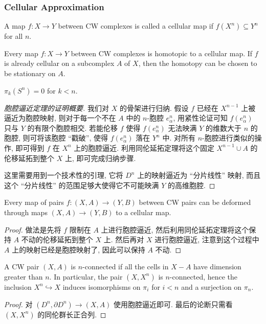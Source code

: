 \subsubsection{Cellular Approximation}
\begin{definition}
    A map $f:X\to Y$ between CW complexes is called a cellular map if $f(X^n)\subseteq Y^n$ for all $n$.
\end{definition}
\begin{theorem}
    Every map $f:X\to Y$ between CW complexes is homotopic to a cellular map. 
    If $f$ is already cellular on a subcomplex $A$ of $X$, then the homotopy can be chosen to be stationary on $A$.
\end{theorem}
\begin{corollary}
    $\pi_k(S^n)=0$ for $k<n$. 
\end{corollary}
\begin{proof}[胞腔逼近定理的证明概要]
    我们对 $X$ 的骨架进行归纳. 假设 $f$ 已经在 $X^{n-1}$ 上被逼近为胞腔映射, 则对于每一个不在 $A$ 中的 $n$-胞腔 $e_\alpha^n$, 
    用紧性论证可知 $f(e_\alpha^n)$ 只与 $Y$ 的有限个胞腔相交. 若能伦移 $f$ 使得 $f(e_\alpha^n)$ 无法映满 $Y$ 的维数大于 $n$ 的胞腔, 
    则可将该胞腔 “戳破”, 使得 $f(e_\alpha^n)$ 落在 $Y^n$ 中. 对所有 $n$-胞腔进行类似的操作, 即可得到 $f$ 在 $X^n$ 上的胞腔逼近. 
    利用同伦延拓定理将这个固定 $X^{n-1}\cup A$ 的伦移延拓到整个 $X$ 上, 即可完成归纳步骤. 

    这里需要用到一个技术性的引理, 它将 $D^n$ 上的映射逼近为 “分片线性” 映射, 而且这个 “分片线性” 的范围足够大使得它不可能映满 $Y$ 的高维胞腔.
\end{proof}
\begin{corollary}
    Every map of pairs $f:(X,A)\to (Y,B)$ between CW pairs can be deformed through maps $(X,A)\to (Y,B)$ to a cellular map.
\end{corollary}
\begin{proof}
    做法是先将 $f$ 限制在 $A$ 上进行胞腔逼近, 然后利用同伦延拓定理将这个保持 $A$ 不动的伦移延拓到整个 $X$ 上. 然后再对 $X$ 进行胞腔逼近, 
    注意到这个过程中 $A$ 上的映射已经是胞腔映射了, 因此可以保持 $A$ 不动.
\end{proof}
\begin{corollary}
    A CW pair $(X,A)$ is $n$-connected if all the cells in $X-A$ have dimension greater than $n$. In particular, the pair 
    $(X,X^n)$ is $n$-connected, hence the inclusion $X^n\hookrightarrow X$ induces 
    isomorphisms on $\pi_i$ for $i<n$ and a surjection on $\pi_n$.
\end{corollary}
\begin{proof}
    对 $(D^n,\partial D^n)\to (X,A)$ 使用胞腔逼近即可. 最后的论断只需看 $(X,X^n)$ 的同伦群长正合列. 
\end{proof}

